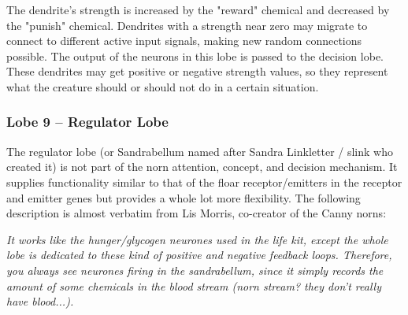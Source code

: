 \documentclass[11pt,twoside,a4paper]{article}
\begin{document}
The dendrite's strength is increased by the "reward" chemical and decreased by the "punish" chemical. Dendrites with a strength near zero may migrate to connect to different active input signals, making new random connections possible. The output of the neurons in this lobe is passed to the decision lobe. These dendrites may get positive or negative strength values, so they represent what the creature should or should not do in a certain situation.~\\

\clearpage

\subsubsection{Lobe 9 -- Regulator Lobe}


The regulator lobe (or Sandrabellum named after Sandra Linkletter / slink who created it) is not part of the norn attention, concept, and decision mechanism. It supplies functionality similar to that of the floar receptor/emitters in the receptor and emitter genes but provides a whole lot more flexibility. The following description is almost verbatim from Lis Morris, co-creator of the Canny norns:

\emph{It works like the hunger/glycogen neurones used in the life kit, except the whole lobe is dedicated to these kind of positive and negative feedback loops. Therefore, you always see neurones firing in the sandrabellum, since it simply records the amount of some chemicals in the blood stream (norn stream? they don't really have blood...).}~\\
\end{document}
